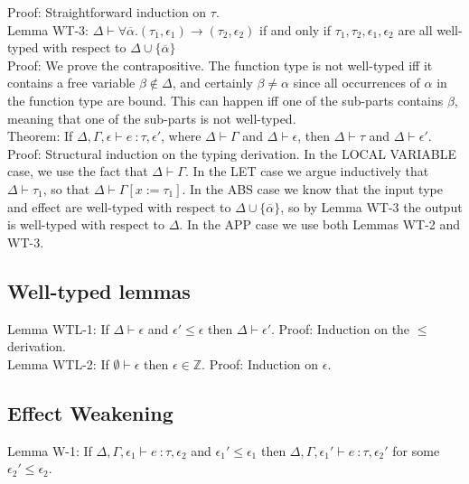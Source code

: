 \documentclass{article}
\newcommand{\Z}{\mathbb{Z}}
\begin{document}
\noindent Proof: Straightforward induction on $\tau$.
\\ 

\noindent Lemma WT-3: $\Delta \vdash \forall \overline \alpha.(\tau_1, \epsilon_1) \rightarrow (\tau_2, \epsilon_2)$  if and only if $\tau_1, \tau_2, \epsilon_1, \epsilon_2$ are all well-typed with respect to $\Delta \cup \{\overline \alpha\}$
\\

\noindent Proof: We prove the contrapositive. The function type is not well-typed iff it contains a free variable $\beta \notin \Delta$, and certainly $\beta \neq \alpha$ since all occurrences of $\alpha$ in the function type are bound. This can happen iff one of the sub-parts contains $\beta$, meaning that one of the sub-parts is not well-typed. 
\\

\noindent Theorem: If $\Delta, \Gamma, \epsilon \vdash e\ \colon \tau, \epsilon'$, where $\Delta \vdash \Gamma$ and $\Delta \vdash \epsilon$, then $\Delta \vdash \tau$ and $\Delta \vdash \epsilon'$.
\\

\noindent Proof: Structural induction on the typing derivation. In the LOCAL VARIABLE case, we use the fact that $\Delta \vdash \Gamma$. In the LET case we argue inductively that $\Delta \vdash \tau_1$, so that $\Delta \vdash \Gamma[x := \tau_1]$. In the ABS case we know that the input type and effect are well-typed with respect to $\Delta \cup \{\overline\alpha\}$, so by Lemma WT-3 the output is well-typed with respect to $\Delta$. In the APP case we use both Lemmas WT-2 and WT-3.

\subsection*{Well-typed lemmas}
Lemma WTL-1: If $\Delta \vdash \epsilon$ and $\epsilon' \leq \epsilon$ then $\Delta \vdash \epsilon'$.
Proof: Induction on the $\leq$ derivation.
\\

\noindent Lemma WTL-2: If $\emptyset \vdash \epsilon$ then $\epsilon \in \Z$. Proof: Induction on $\epsilon$.

\subsection*{Effect Weakening}
Lemma W-1: If $\Delta, \Gamma, \epsilon_1 \vdash e\ \colon \tau, \epsilon_2$ and $\epsilon_1' \leq \epsilon_1$ then $\Delta, \Gamma, \epsilon_1' \vdash e\ \colon \tau, \epsilon_2'$ for some $\epsilon_2' \leq \epsilon_2$.
\\
\end{document}
